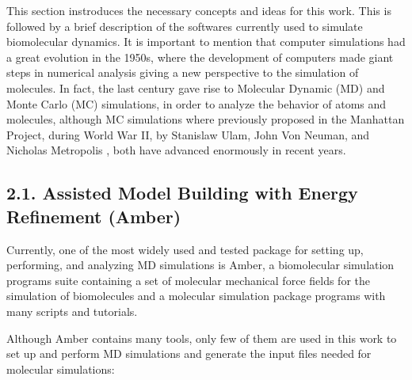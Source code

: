 \documentclass[
  journal=usp, %
  manuscript=final-report,
  year=2023,
  volume=1,
]{cup-journal}
\begin{document}


This section instroduces the necessary concepts and ideas for this work. This is followed by a brief description of the softwares currently used to simulate biomolecular dynamics. It is important to mention that computer simulations had a great evolution in the 1950s, where the development of computers made giant steps in numerical analysis giving a new perspective to the simulation of molecules. In fact, the last century gave rise to Molecular Dynamic (MD) and Monte Carlo (MC) simulations, in order to analyze the behavior of atoms and molecules, although MC simulations where previously proposed in the Manhattan Project, during World War II, by Stanislaw Ulam, John Von Neuman, and Nicholas Metropolis \cite{MD_history}, both have advanced enormously in recent years. 


\subsection{\textbf{2.1. Assisted Model Building with Energy Refinement (Amber)}}

Currently, one of the most widely used and tested package for setting up, performing, and analyzing MD simulations is Amber, a biomolecular simulation programs suite containing a set of molecular mechanical force fields for the simulation of biomolecules and a molecular simulation package programs with many scripts and tutorials.

Although Amber contains many tools, only few of them are used in this work to set up and perform MD simulations and generate the input files needed for molecular simulations:
\end{document}
